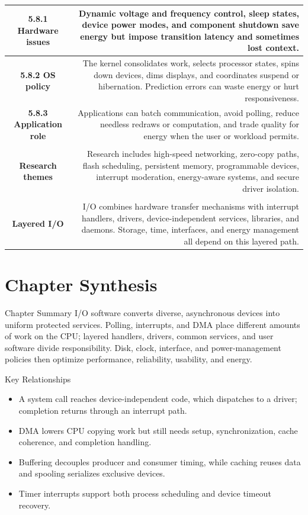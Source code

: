 \documentclass[10pt,letterpaper]{article}
\begin{document}
\begin{longtable}{C N}
\textbf{5.8.1 Hardware issues} & Dynamic voltage and frequency control, sleep states, device power modes, and component shutdown save energy but impose transition latency and sometimes lost context.\\\hline
\textbf{5.8.2 OS policy} & The kernel consolidates work, selects processor states, spins down devices, dims displays, and coordinates suspend or hibernation. Prediction errors can waste energy or hurt responsiveness.\\\hline
\textbf{5.8.3 Application role} & Applications can batch communication, avoid polling, reduce needless redraws or computation, and trade quality for energy when the user or workload permits.\\\hline
{}\\*\hline
\textbf{Research themes} & Research includes high-speed networking, zero-copy paths, flash scheduling, persistent memory, programmable devices, interrupt moderation, energy-aware systems, and secure driver isolation.\\\hline
{}\\*\hline
\textbf{Layered I/O} & I/O combines hardware transfer mechanisms with interrupt handlers, drivers, device-independent services, libraries, and daemons. Storage, time, interfaces, and energy management all depend on this layered path.\\\hline
\end{longtable}
\normalsize

\section*{Chapter Synthesis}
\begin{studybox}{Chapter Summary}
I/O software converts diverse, asynchronous devices into uniform protected services. Polling, interrupts, and DMA place different amounts of work on the CPU; layered handlers, drivers, common services, and user software divide responsibility. Disk, clock, interface, and power-management policies then optimize performance, reliability, usability, and energy.
\end{studybox}

\begin{studybox}{Key Relationships}
\begin{itemize}
  \item A system call reaches device-independent code, which dispatches to a driver; completion returns through an interrupt path.
  \item DMA lowers CPU copying work but still needs setup, synchronization, cache coherence, and completion handling.
  \item Buffering decouples producer and consumer timing, while caching reuses data and spooling serializes exclusive devices.
  \item Timer interrupts support both process scheduling and device timeout recovery.
\end{itemize}
\end{studybox}
\end{document}
